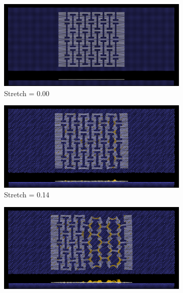 \begin{figure}[H]
    \centering
    \begin{subfigure}[b]{0.49\textwidth}
        \centering
        \includegraphics[width=\textwidth]{figures/baseline/contact_vs_stretch/honeycomb/hon_stretch0000.png}
        \caption{Stretch = 0.00}
        \label{fig:}
    \end{subfigure}
    \hfill
    \begin{subfigure}[b]{0.49\textwidth}
        \centering
        \includegraphics[width=\textwidth]{figures/baseline/contact_vs_stretch/honeycomb/hon_stretch0014.png}
        \caption{Stretch = 0.14}
        \label{fig:}
    \end{subfigure}
    \begin{subfigure}[b]{0.49\textwidth}
        \centering
        \includegraphics[width=\textwidth]{figures/baseline/contact_vs_stretch/honeycomb/hon_stretch0028.png}

\end{subfigure}
\end{figure}

